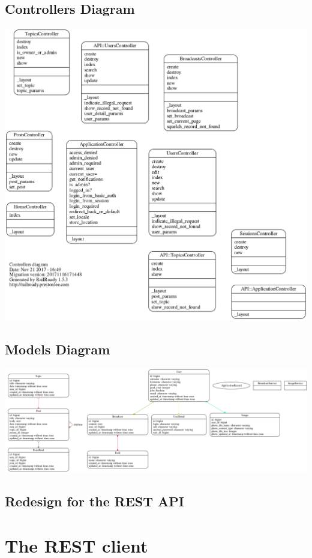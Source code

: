 \documentclass[a4paper, 11pt, titlepage]{article}
\begin{document}
\subsection{Controllers Diagram}
\includegraphics[scale=0.5]{controllers}
\begin{landscape}

  \subsection{Models Diagram}
  \includegraphics[scale=0.5]{models}
\end{landscape}

\subsection{Redesign for the REST API}


\section{The REST client}
\end{document}
